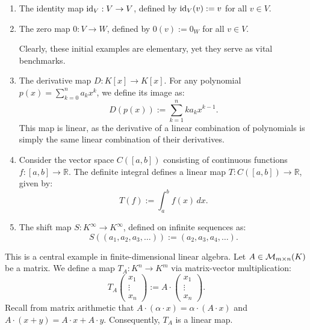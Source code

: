 \begin{example}
\label{ex:fundamental_linear_maps}
\begin{enumerate}
    \item The identity map $\operatorname{id}_V: V \to V$, defined by $\operatorname{id}_V(v) := v$ for all $v \in V$.
    \item The zero map $0: V \to W$, defined by $0(v) := 0_W$ for all $v \in V$. 
    
    Clearly, these initial examples are elementary, yet they serve as vital benchmarks.
    
    \item The derivative map $D: K[x] \to K[x]$. For any polynomial $p(x) = \sum_{k=0}^n a_k x^k$, we define its image as:
    \[
    D(p(x)) := \sum_{k=1}^n k a_k x^{k-1}.
    \]
    This map is linear, as the derivative of a linear combination of polynomials is simply the same linear combination of their derivatives.
    
    \item Consider the vector space $C([a, b])$ consisting of continuous functions $f: [a, b] \to \mathbb{R}$. The definite integral defines a linear map $T: C([a, b]) \to \mathbb{R}$, given by:
    \[
    T(f) := \int_a^b f(x) \, dx.
    \]
    
    \item The shift map $S: K^\infty \to K^\infty$, defined on infinite sequences as:
    \[
    S((a_1, a_2, a_3, \dots)) := (a_2, a_3, a_4, \dots).
    \]
\end{enumerate}
\end{example}

\begin{example}
\label{ex:matrix_transformation}
This is a central example in finite-dimensional linear algebra. Let $A \in \mathcal{M}_{m \times n}(K)$ be a matrix. We define a map $T_A: K^n \to K^m$ via matrix-vector multiplication:
\[
T_A \begin{pmatrix} x_1 \\ \vdots \\ x_n \end{pmatrix} := A \cdot \begin{pmatrix} x_1 \\ \vdots \\ x_n \end{pmatrix}.
\]
Recall from matrix arithmetic that $A \cdot (\alpha \cdot x) = \alpha \cdot (A \cdot x)$ and $A \cdot (x + y) = A \cdot x + A \cdot y$. Consequently, $T_A$ is a linear map.
\end{example}

